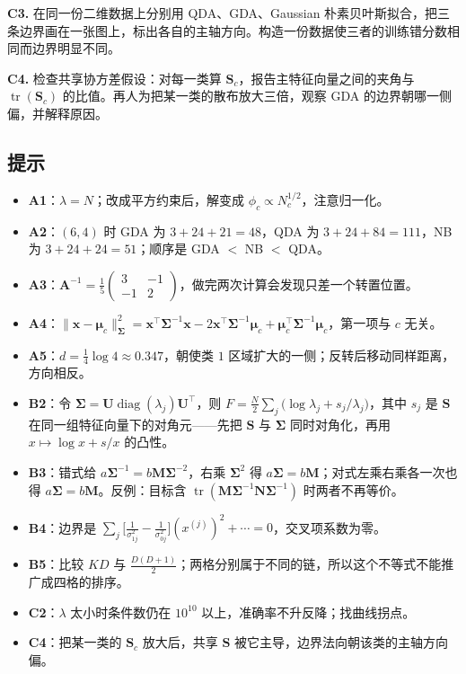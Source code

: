 \documentclass[11pt,a4paper,fontset=windows,zihao=-4]{ctexart}
\newcommand{\bx}{\mathbf{x}}
\newcommand{\bA}{\mathbf{A}}
\newcommand{\bM}{\mathbf{M}}
\newcommand{\bN}{\mathbf{N}}
\newcommand{\bS}{\mathbf{S}}
\newcommand{\bU}{\mathbf{U}}
\newcommand{\bSigma}{\boldsymbol{\Sigma}}
\newcommand{\bmu}{\boldsymbol{\mu}}
\newcommand{\tp}{^{\top}}
\newcommand{\norm}[1]{\lVert #1\rVert}
\DeclareMathOperator{\tr}{tr}
\DeclareMathOperator{\diag}{diag}
\begin{document}
\noindent\textbf{C3.} 在同一份二维数据上分别用 QDA、GDA、Gaussian 朴素贝叶斯拟合，把三条边界画在一张图上，标出各自的主轴方向。构造一份数据使三者的训练错分数相同而边界明显不同。

\noindent\textbf{C4.} 检查共享协方差假设：对每一类算 $\bS_c$，报告主特征向量之间的夹角与 $\tr(\bS_c)$ 的比值。再人为把某一类的散布放大三倍，观察 GDA 的边界朝哪一侧偏，并解释原因。

\subsection*{提示}

\begin{itemize}[itemsep=0.2em]
  \item \textbf{A1}：$\lambda=N$；改成平方约束后，解变成 $\phi_c\propto N_c^{1/2}$，注意归一化。
  \item \textbf{A2}：$(6,4)$ 时 GDA 为 $3+24+21=48$，QDA 为 $3+24+84=111$，NB 为 $3+24+24=51$；顺序是 GDA $<$ NB $<$ QDA。
  \item \textbf{A3}：$\bA^{-1}=\frac15\begin{pmatrix}3&-1\\-1&2\end{pmatrix}$，做完两次计算会发现只差一个转置位置。
  \item \textbf{A4}：$\norm{\bx-\bmu_c}^2_{\bSigma}=\bx\tp\bSigma^{-1}\bx-2\bx\tp\bSigma^{-1}\bmu_c+\bmu_c\tp\bSigma^{-1}\bmu_c$，第一项与 $c$ 无关。
  \item \textbf{A5}：$d=\frac14\log4\approx0.347$，朝使类 $1$ 区域扩大的一侧；反转后移动同样距离，方向相反。
  \item \textbf{B2}：令 $\bSigma=\bU\diag(\lambda_j)\bU\tp$，则 $F=\frac N2\sum_j\bigl(\log\lambda_j+s_j/\lambda_j\bigr)$，其中 $s_j$ 是 $\bS$ 在同一组特征向量下的对角元——先把 $\bS$ 与 $\bSigma$ 同时对角化，再用 $x\mapsto\log x+s/x$ 的凸性。
  \item \textbf{B3}：错式给 $a\bSigma^{-1}=b\bM\bSigma^{-2}$，右乘 $\bSigma^2$ 得 $a\bSigma=b\bM$；对式左乘右乘各一次也得 $a\bSigma=b\bM$。反例：目标含 $\tr(\bM\bSigma^{-1}\bN\bSigma^{-1})$ 时两者不再等价。
  \item \textbf{B4}：边界是 $\sum_j\bigl[\frac{1}{\sigma_{1j}^2}-\frac{1}{\sigma_{0j}^2}\bigr](x^{(j)})^2+\cdots=0$，交叉项系数为零。
  \item \textbf{B5}：比较 $KD$ 与 $\frac{D(D+1)}{2}$；两格分别属于不同的链，所以这个不等式不能推广成四格的排序。
  \item \textbf{C2}：$\lambda$ 太小时条件数仍在 $10^{10}$ 以上，准确率不升反降；找曲线拐点。
  \item \textbf{C4}：把某一类的 $\bS_c$ 放大后，共享 $\bS$ 被它主导，边界法向朝该类的主轴方向偏。
\end{itemize}
\end{document}
